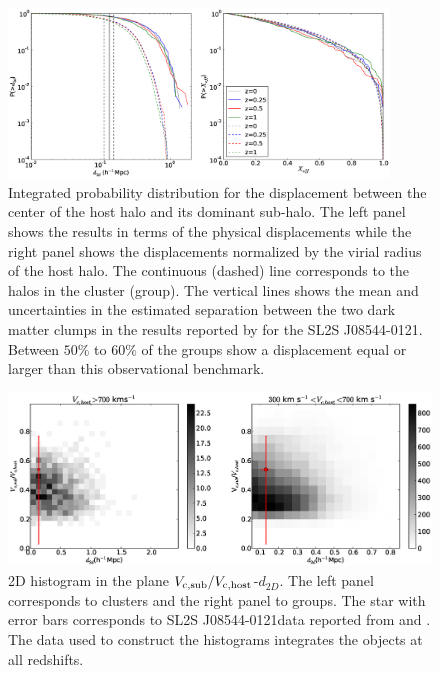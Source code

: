 \documentclass{emulateapj}
\newcommand{\bullg}{SL2S J08544-0121}
\begin{document}
\begin{figure}
\begin{center}
\includegraphics[width=0.9\textwidth]{figure_1.eps}
\end{center}
\caption{
  Integrated probability distribution for the displacement
  between the center of the host halo and its dominant sub-halo. The left panel
  shows the results in terms of the physical displacements while
  the right panel shows the displacements normalized by the virial radius of
  the host halo. The continuous (dashed) line corresponds to the halos in the
  cluster (group).
  The vertical lines shows the mean and uncertainties in the estimated
  separation  between the two dark matter clumps in the results reported by
  \citet{Gastaldello} for the \bullg. Between $50\%$
  to $60\%$ of the groups show a displacement equal or larger than
  this observational benchmark.}
\label{fig:displacement}
\end{figure}

\begin{figure}
\begin{center}
\includegraphics[width=1.0\textwidth]{figure_2.eps} 
\end{center}
\caption{2D histogram in the plane $V_{\rm c,sub}/V_{\rm
    c,host}$-$d_{2D}$. The left panel corresponds to clusters and the
  right panel to groups. The star with error bars corresponds to
  \bullg data reported from \citet{2013A&A...552A..80M} and
  \citet{Gastaldello}. The data used to construct the histograms
  integrates the objects at all redshifts. }
\label{fig:mass_displacement}
\end{figure}
\end{document}
